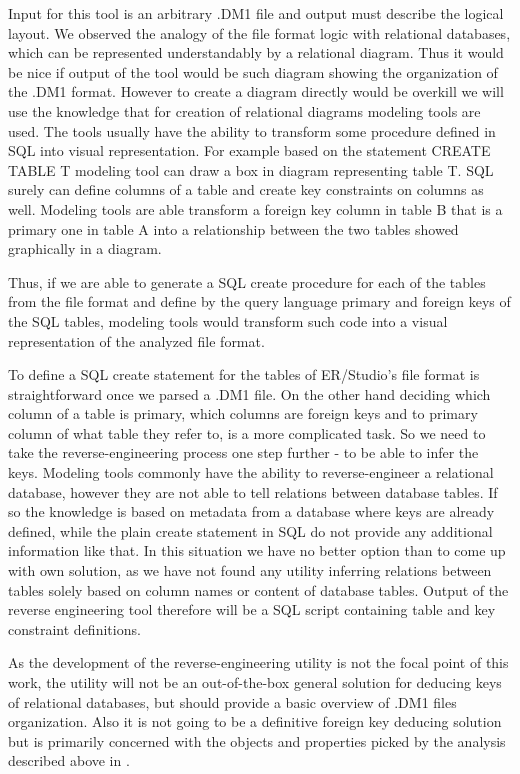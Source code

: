 Input for this tool is an arbitrary .DM1 file and output must describe the logical layout. 
We observed the analogy of the file format logic with relational databases, which can be represented understandably by a relational diagram. Thus it would be nice  if output of the tool would be such diagram showing the organization of the .DM1 format.
However to create a diagram directly would be overkill we will use the knowledge that for creation of relational diagrams modeling tools are used.
The tools usually have the ability to transform some procedure defined in SQL into visual representation. 
For example based on the statement CREATE TABLE T modeling tool can draw a box in diagram representing table T. 
SQL surely can define columns of a table and create key constraints on columns as well. 
Modeling tools are able transform a foreign key column in table B that is a primary one in table A into a relationship between the two tables showed graphically in a diagram.

Thus, if we are able to generate a SQL create procedure for each of the tables from the file format and define by the query language primary and foreign keys of the SQL tables, modeling tools would transform such code into a visual representation of the analyzed file format.

To define a SQL create statement for the tables of ER/Studio's file format is straightforward once we parsed a .DM1 file. On the other hand deciding which column of a table is primary, which columns are foreign keys and to primary column of what table they refer to, is a more complicated task.
So we need to take the reverse-engineering process one step further - to be able to infer the keys.
Modeling tools commonly have the ability to reverse-engineer a relational database, however they are not able to tell relations between database tables. If so the knowledge is based on metadata from a database where keys are already defined, while the plain create statement in SQL do not provide any additional information like that.
In this situation we have no better option than to come up with own solution, as we have not found any utility inferring relations between tables solely based on column names or content of database tables.
Output of the reverse engineering tool therefore will be a SQL script containing table and key constraint definitions. 

As the development of the reverse-engineering utility is not the focal point of this work, the utility will not be an out-of-the-box general solution for deducing keys of relational databases, but should provide a basic overview of .DM1 files organization. 
Also it is not going to be a definitive foreign key deducing solution but is primarily concerned with the objects and properties picked by the analysis described above in .


